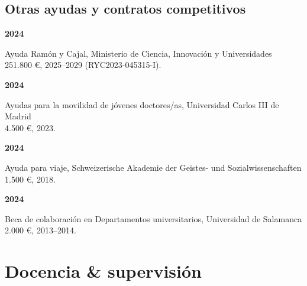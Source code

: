 \documentclass[a4paper, 12pt]{article}
\begin{document}
\subsection*{Otras ayudas y contratos competitivos}
\vspace{10pt}

\noindent
\begin{minipage}[t]{0.1\textwidth}
\textbf{2024}
\end{minipage}\hfill\begin{minipage}[t]{0.9\textwidth}
Ayuda Ramón y Cajal, Ministerio de Ciencia, Innovación y Universidades\\
251.800 €, 2025--2029 (RYC2023-045315-I).\\\vspace{-8pt}
\end{minipage}
\begin{minipage}[t]{0.1\textwidth}
\textbf{2024}
\end{minipage}\hfill\begin{minipage}[t]{0.9\textwidth}
Ayudas para la movilidad de jóvenes doctores/as, Universidad Carlos III de Madrid\\
4.500 €, 2023.\\\vspace{-8pt} %
\end{minipage}
\begin{minipage}[t]{0.1\textwidth}
\textbf{2024}
\end{minipage}\hfill\begin{minipage}[t]{0.9\textwidth}
Ayuda para viaje, Schweizerische Akademie der Geistes- und Sozialwissenschaften\\
1.500 €, 2018.
\\\vspace{-8pt}
\end{minipage}
\begin{minipage}[t]{0.1\textwidth}
\textbf{2024}
\end{minipage}\hfill\begin{minipage}[t]{0.9\textwidth}
Beca de colaboración en Departamentos universitarios, Universidad de Salamanca\\
2.000 €, 2013--2014.
\\\vspace{-8pt}
\end{minipage}

\section*{Docencia \& supervisión}
\end{document}
